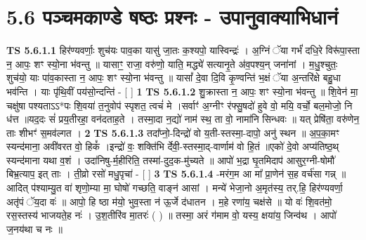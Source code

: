 \documentclass[17pt]{extarticle}
\begin{document}
     \section*{ 5.6      पञ्चमकाण्डे षष्ठः प्रश्नः - उपानुवाक्याभिधानं }
                                        \textbf{ TS 5.6.1.1} \newline
                  हिर॑ण्यवर्णाः॒ शुच॑यः पाव॒का यासु॑ जा॒तः क॒श्यपो॒ यास्विन्द्रः॑ । अ॒ग्निं ॅया गर्भं॑ दधि॒रे विरू॑पा॒स्ता न॒ आपः॒ शꣳ स्यो॒ना भ॑वन्तु ॥ यासाꣳ॒॒ राजा॒ वरु॑णो॒ याति॒ मद्ध्ये॑ सत्यानृ॒ते अ॑व॒पश्य॒न् जना॑नां । म॒धु॒श्चुतः॒ शुच॑यो॒ याः पा॑व॒कास्ता न॒ आपः॒ शꣳ स्यो॒ना भ॑वन्तु ॥ यासां᳚ दे॒वा दि॒वि कृ॒ण्वन्ति॑ भ॒क्षं ॅया अ॒न्तरि॑क्षे बहु॒धा भव॑न्ति । याः पृ॑थि॒वीं पय॑सो॒न्दन्ति॑ - [  ] \textbf{  1} \newline
                  \newline
                                \textbf{ TS 5.6.1.2} \newline
                  शु॒क्रास्ता न॒ आपः॒ शꣳ स्यो॒ना भ॑वन्तु ॥ शि॒वेन॑ मा॒ चक्षु॑षा पश्यताऽऽ*पः शि॒वया॑ त॒नुवोप॑ स्पृशत॒ त्वचं॑ मे ।सर्वाꣳ॑ अ॒ग्नीꣳ र॑फ्सु॒षदो॑ हुवे वो॒ मयि॒ वर्चो॒ बल॒मोजो॒ नि ध॑त्त ॥यद॒दः सं॑ प्रय॒॒तीरहा॒॒ वन॑दताह॒ते । तस्मा॒दा न॒द्यो॑ नाम॑ स्थ॒ ता वो॒ नामा॑नि सिन्धवः ॥ यत् प्रेषि॑ता॒ वरु॑णेन॒ ताः शीभꣳ॑ स॒मव॑ल्गत । \textbf{  2} \newline
                  \newline
                                \textbf{ TS 5.6.1.3} \newline
                  तदा᳚प्नो॒-दिन्द्रो॑ वो य॒ती-स्तस्मा॒-दापो॒ अनु॑ स्थन ॥ अ॒प॒का॒मꣳ स्यन्द॑माना॒ अवी॑वरत वो॒ हिकं᳚ ।इन्द्रो॑ वः॒ शक्ति॑भि र्देवी॒-स्तस्मा॒द्-वार्णाम॑ वो हि॒तं ॥एको॑ दे॒वो अप्य॑तिष्ठ॒थ् स्यन्द॑माना यथा व॒शं । उदा॑निषु-र्म॒हीरिति॒ तस्मा॑-दुद॒क-मु॑च्यते ॥ आपो॑ भ॒द्रा घृ॒तमिदाप॑ आसुर॒ग्नी-षोमौ॑ बिभ्र॒त्याप॒ इत् ताः । ती॒व्रो रसो॑ मधु॒पृचा॑ - [  ] \textbf{  3} \newline
                  \newline
                                \textbf{ TS 5.6.1.4} \newline
                  -मरंग॒म आ मा᳚ प्रा॒णेन॑ स॒ह वर्च॑सा गन्न् ॥ आदित् प॑श्याम्यु॒त वा॑ शृणो॒म्या मा॒ घोषो॑ गच्छति॒ वाङ्न॑ आसां । मन्ये॑ भेजा॒नो अ॒मृत॑स्य॒ तर्.हि॒ हिर॑ण्यवर्णा॒ अतृ॑पं ॅय॒दा वः॑ ॥ आपो॒ हि ष्ठा म॑यो॒ भुव॒स्ता न॑ ऊ॒र्जे द॑धातन । म॒हे रणा॑य॒ चक्ष॑से ॥ यो वः॑ शि॒वत॑मो॒ रस॒स्तस्य॑ भाजयते॒ह नः॑ । उ॒श॒तीरि॑व मा॒तरः॑ ( ) ॥ तस्मा॒ अरं ग॑माम वो॒ यस्य॒ क्षया॑य॒ जिन्व॑थ । आपो॑ ज॒नय॑था च नः ॥ \textbf{ } \newline
                  \newline
\end{document}
